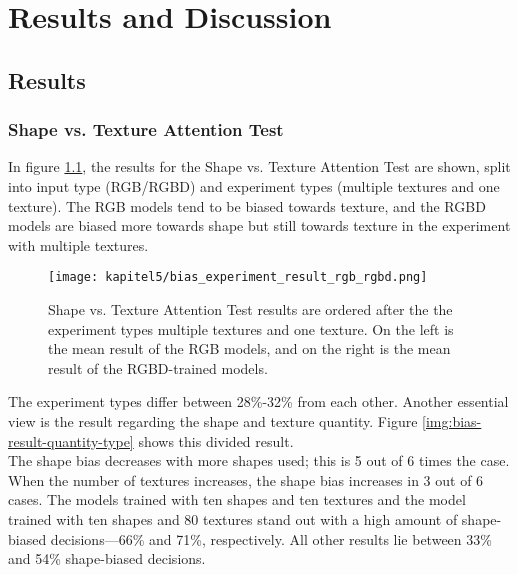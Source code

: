 \chapter{Results and Discussion}
\label{chap:kapitel5}

	\section{Results}
	\label{sec:results}
	
		\subsection{Shape vs. Texture Attention Test}
			In figure \ref{img:bias-result-input-type}, the results for the Shape vs. Texture Attention Test are shown, split into input type (RGB/RGBD) and experiment types (multiple textures and one texture). The RGB models tend to be biased towards texture, and the RGBD models are biased more towards shape but still towards texture in the experiment with multiple textures.
			\begin{figure}[h]
				\centering
				\texttt{[image: kapitel5/bias\_experiment\_result\_rgb\_rgbd.png]}
				\caption[Shape vs. Texture Attention Test results are ordered after the the experiment types multiple textures and one texture. On the left is the mean result of the RGB models, and on the right is the mean result of the RGBD-trained models.]{Shape vs. Texture Attention Test results are ordered after the the experiment types multiple textures and one texture. On the left is the mean result of the RGB models, and on the right is the mean result of the RGBD-trained models.}
				\label{img:bias-result-input-type}
			\end{figure}
			\FloatBarrier
			
			The experiment types differ between 28\%-32\% from each other.
			\clearpage
			Another essential view is the result regarding the shape and texture quantity. Figure \ref{img:bias-result-quantity-type} shows this divided result.\\
			The shape bias decreases with more shapes used; this is 5 out of 6 times the case. When the number of textures increases, the shape bias increases in 3 out of 6 cases. The models trained with ten shapes and ten textures and the model trained with ten shapes and 80 textures stand out with a high amount of shape-biased decisions—66\% and 71\%, respectively. All other results lie between 33\% and 54\%  shape-biased decisions.
			
